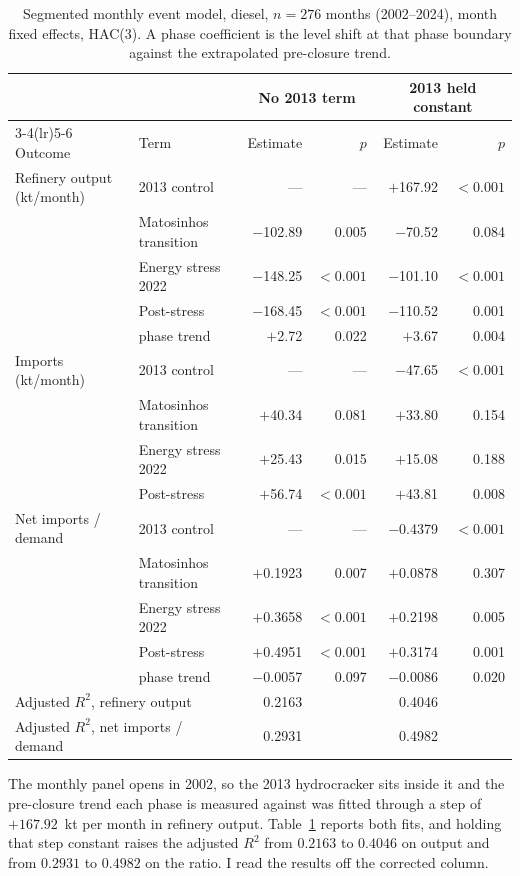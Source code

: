 \documentclass[11pt,a4paper]{article}
\begin{document}
\begin{table}[htbp]
\centering
\caption{Segmented monthly event model, diesel, $n=276$ months (2002--2024), month fixed
effects, HAC(3).
A phase coefficient is the level shift at that phase boundary against the extrapolated
pre-closure trend.}
\label{tab:monthly}
\small
\begin{tabular}{llrrrr}
\toprule
& & \multicolumn{2}{c}{No 2013 term} & \multicolumn{2}{c}{2013 held constant} \\
\cmidrule(lr){3-4}\cmidrule(lr){5-6}
Outcome & Term & Estimate & $p$ & Estimate & $p$ \\
\midrule
Refinery output (kt/month) & 2013 control & --- & --- & $+$167.92 & $<0.001$ \\
 & Matosinhos transition & $-$102.89 & 0.005 & $-$70.52 & 0.084 \\
 & Energy stress 2022 & $-$148.25 & $<0.001$ & $-$101.10 & $<0.001$ \\
 & Post-stress & $-$168.45 & $<0.001$ & $-$110.52 & 0.001 \\
 & \quad phase trend & $+$2.72 & 0.022 & $+$3.67 & 0.004 \\
\midrule
Imports (kt/month) & 2013 control & --- & --- & $-$47.65 & $<0.001$ \\
 & Matosinhos transition & $+$40.34 & 0.081 & $+$33.80 & 0.154 \\
 & Energy stress 2022 & $+$25.43 & 0.015 & $+$15.08 & 0.188 \\
 & Post-stress & $+$56.74 & $<0.001$ & $+$43.81 & 0.008 \\
\midrule
Net imports / demand & 2013 control & --- & --- & $-$0.4379 & $<0.001$ \\
 & Matosinhos transition & $+$0.1923 & 0.007 & $+$0.0878 & 0.307 \\
 & Energy stress 2022 & $+$0.3658 & $<0.001$ & $+$0.2198 & 0.005 \\
 & Post-stress & $+$0.4951 & $<0.001$ & $+$0.3174 & 0.001 \\
 & \quad phase trend & $-$0.0057 & 0.097 & $-$0.0086 & 0.020 \\
\midrule
\multicolumn{2}{l}{Adjusted $R^2$, refinery output} & 0.2163 & & 0.4046 & \\
\multicolumn{2}{l}{Adjusted $R^2$, net imports / demand} & 0.2931 & & 0.4982 & \\
\bottomrule
\end{tabular}
\end{table}

The monthly panel opens in 2002, so the 2013 hydrocracker sits inside it and the pre-closure
trend each phase is measured against was fitted through a step of $+167.92$~kt per month in
refinery output. Table~\ref{tab:monthly} reports both fits, and holding that step constant
raises the adjusted $R^2$ from $0.2163$ to $0.4046$ on output and from $0.2931$ to $0.4982$ on
the ratio. I read the results off the corrected column.
\end{document}
